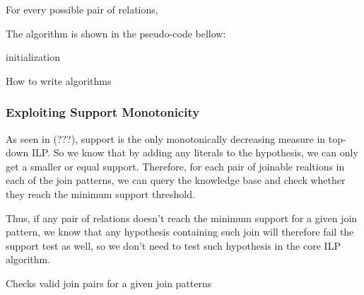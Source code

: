 For every possible pair of relations, 

The algorithm is shown in the pseudo-code bellow:

\begin{algorithm}[5]

  
 initialization\;
 \caption{How to write algorithms}
\end{algorithm}

\subsubsection{Exploiting Support Monotonicity}

As seen in (???), support is the only monotonically decreasing measure in top-down ILP. So we know that by adding any literals to the hypothesis, we can only get a smaller or equal support. Therefore, for each pair of joinable realtions in each of the join patterns, we can query the knowledge base and check whether they reach the minimum support threshold.

Thus, if any pair of relations doesn't reach the minimum support for a given join pattern, we know that any hypothesis containing such join will therefore fail the support test as well, so we don't need to test such hypothesis in the core ILP algorithm.


\begin{algorithm}
  \caption{Checks valid join pairs for a given join patterns}
  
\end{algorithm}

